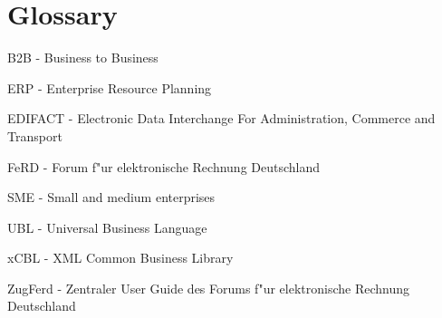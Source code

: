 %
% 

\chapter{Glossary}



B2B - Business to Business


ERP - Enterprise Resource Planning


EDIFACT - Electronic Data Interchange For Administration, Commerce and Transport


FeRD - Forum f"ur elektronische Rechnung Deutschland


SME - Small and medium enterprises


UBL - Universal Business Language


xCBL - XML Common Business Library


ZugFerd - Zentraler User Guide des Forums f"ur elektronische Rechnung Deutschland